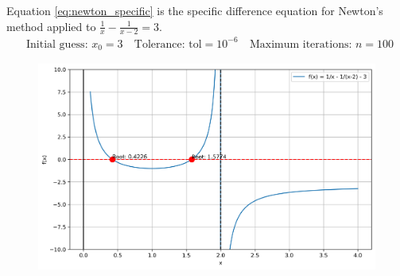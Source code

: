 \documentclass[journal]{IEEEtran}
\begin{document}
Equation \eqref{eq:newton_specific} is the specific difference equation for Newton's method applied to $\frac{1}{x} - \frac{1}{x-2} = 3$.
\begin{align}
&\text{Initial guess: } x_0 = 3 \
&\text{Tolerance: } \text{tol} = 10^{-6} \
&\text{Maximum iterations: } n = 100 \
\end{align}
\begin{figure}[h]
    \centering
    \includegraphics[width=\textwidth]{figs/fig.png}
\end{figure}
\end{document}
